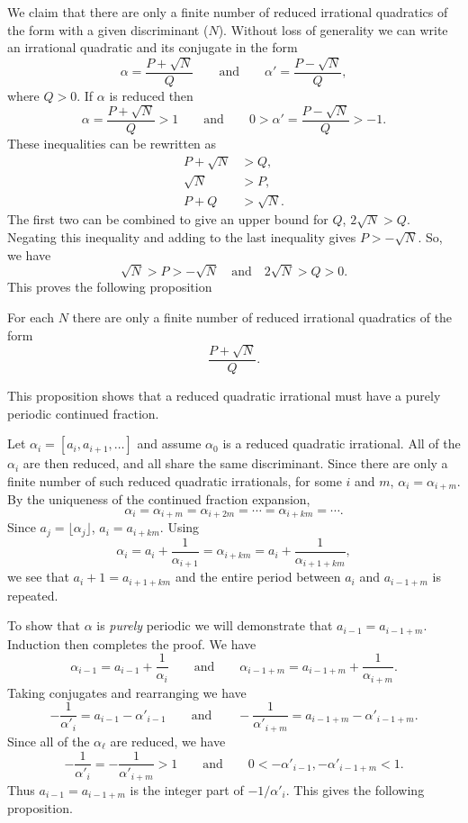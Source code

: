 We claim that there are only a finite number of reduced irrational
quadratics of the form  with a given discriminant
($N$).  Without loss of generality we can write an irrational
quadratic and its conjugate in the form
\begin{equation}\label{CF:IQ:Eq}
\alpha = \frac{P+\sqrt{N}}{Q} \qquad \mbox{and}\qquad
\alpha' = \frac{P-\sqrt{N}}{Q},
\end{equation}
where $Q > 0$.   If $\alpha$ is reduced then
\[
\alpha = \frac{P+\sqrt{N}}{Q} > 1 \qquad \mbox{and}\qquad
0 > \alpha' = \frac{P-\sqrt{N}}{Q} > -1.
\]
These inequalities can be rewritten as
\[
\begin{aligned}
P + \sqrt{N} & > Q, \\
\sqrt{N} & > P, \\
P+Q & > \sqrt{N}.
\end{aligned}
\]
The first two can be combined to give an upper bound for $Q$,
$2\sqrt{N} > Q$.  Negating this inequality and adding to the last 
inequality gives $P > - \sqrt{N}$.  So, we have
\[
\sqrt{N} > P > -\sqrt{N}
\quad \mbox{and} \quad
2\sqrt{N} > Q > 0.
\]
This proves the following proposition

\begin{proposition}
For each $N$ there are only a finite number of reduced irrational
quadratics of the form 
\[
\frac{P + \sqrt{N}}{Q}.
\]
\end{proposition}

This proposition shows that a reduced quadratic irrational must have a
purely periodic continued fraction.

Let $\alpha_i = [a_i, a_{i+1}, \ldots]$ and assume $\alpha_0$ is a
reduced quadratic irrational.  All of the $\alpha_i$ are then reduced,
and all share the same discriminant.  Since there are only a finite
number of such reduced quadratic irrationals, for some $i$ and
$m$, $\alpha_i = \alpha_{i+m}$.  By the uniqueness of the
continued fraction expansion, 
\[
\alpha_i = \alpha_{i+m} = \alpha_{i+2m} = \cdots = \alpha_{i + k m} = \cdots.
\]
Since $a_j = \lfloor \alpha_j \rfloor$, $a_i = a_{i+km}$.  Using
\[
\alpha_{i} = a_{i} + \frac{1}{\alpha_{i+1}} =
\alpha_{i+km} = a_{i} + \frac{1}{\alpha_{i+1+km}},
\]
we see that $a_i+1 = a_{i+1+km}$ and the entire period between $a_i$
and $a_{i-1+m}$ is repeated.

To show that $\alpha$ is {\em purely} periodic we will demonstrate
that $a_{i-1} = a_{i-1+m}$.  Induction then completes the proof.  We
have
\[
\alpha_{i-1} = a_{i-1} + \frac{1}{\alpha_i} \qquad \mbox{and}\qquad
\alpha_{i-1+m} = a_{i-1+m} + \frac{1}{\alpha_{i+m}}.
\]
Taking conjugates and rearranging we have
\[
-\frac{1}{\alpha'_i} = a_{i-1} - \alpha'_{i-1} \qquad\mbox{and}\qquad
-\frac{1}{\alpha'_{i+m}} = a_{i-1+m} - \alpha'_{i-1+m} .
\]
Since all of the $\alpha_{\ell}$ are reduced, we have
\[
-\frac{1}{\alpha'_i} = -\frac{1}{\alpha'_{i+m}} > 1 \qquad\mbox{and}\qquad
0 < -\alpha'_{i-1}, -\alpha'_{i-1+m} < 1.
\]
Thus $a_{i-1} = a_{i-1+m}$ is the integer part of $-1/\alpha'_i$.
This gives the following proposition. 

